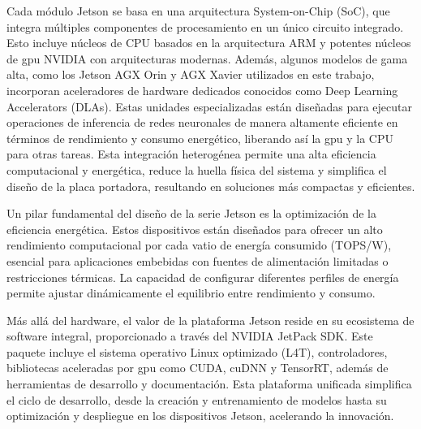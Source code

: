 \documentclass[11pt,spanish,listoffigures,listoftables]{tfgetsinf}
\begin{document}
Cada módulo Jetson se basa en una arquitectura System-on-Chip (SoC), que integra múltiples componentes de procesamiento en un único circuito integrado. Esto incluye núcleos de CPU basados en la arquitectura ARM y potentes núcleos de \gls{gpu} NVIDIA con arquitecturas modernas. Además, algunos modelos de gama alta, como los Jetson AGX Orin y AGX Xavier utilizados en este trabajo, incorporan aceleradores de hardware dedicados conocidos como Deep Learning Accelerators (DLAs). Estas unidades especializadas están diseñadas para ejecutar operaciones de inferencia de redes neuronales de manera altamente eficiente en términos de rendimiento y consumo energético, liberando así la \gls{gpu} y la CPU para otras tareas. Esta integración heterogénea permite una alta eficiencia computacional y energética, reduce la huella física del sistema y simplifica el diseño de la placa portadora, resultando en soluciones más compactas y eficientes.

Un pilar fundamental del diseño de la serie Jetson es la optimización de la eficiencia energética. Estos dispositivos están diseñados para ofrecer un alto rendimiento computacional por cada vatio de energía consumido (TOPS/W), esencial para aplicaciones embebidas con fuentes de alimentación limitadas o restricciones térmicas. La capacidad de configurar diferentes perfiles de energía permite ajustar dinámicamente el equilibrio entre rendimiento y consumo.

Más allá del hardware, el valor de la plataforma Jetson reside en su ecosistema de software integral, proporcionado a través del NVIDIA JetPack SDK. Este paquete incluye el sistema operativo Linux optimizado (L4T), controladores, bibliotecas aceleradas por \gls{gpu} como CUDA, cuDNN y TensorRT, además de herramientas de desarrollo y documentación. Esta plataforma unificada simplifica el ciclo de desarrollo, desde la creación y entrenamiento de modelos hasta su optimización y despliegue en los dispositivos Jetson, acelerando la innovación.

\begin{table}[H]
   \centering
   \caption{Comparativa técnica entre diferentes modelos NVIDIA Jetson.}
   \label{tab:jetson_comparison}
\end{table}
\end{document}

